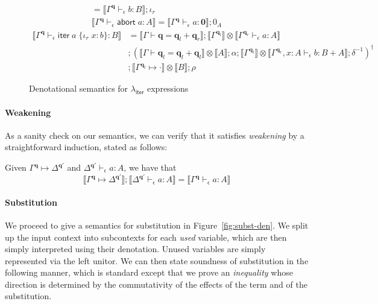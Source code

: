 \documentclass[acmsmall,screen,review]{acmart}
\newcommand{\mb}[1]{\ensuremath{\mathbf{#1}}}
\newcommand{\ms}[1]{\ensuremath{\mathsf{#1}}}
\newcommand{\lto}{:}
\newcommand{\linr}[1]{\iota_r\;{#1}}
\newcommand{\labort}[1]{\ms{abort}\;{#1}}
\newcommand{\liter}[3]{\ms{iter}\;#1\;\{ \linr{#2} \lto #3 \}}
\newcommand{\qsp}[4]{#1 \vdash #2 = #3 + #4}
\newcommand{\cwk}[2]{#1 \mapsto #2}
\newcommand{\hasty}[4]{#1 \vdash_{#2} #3: {#4}}
\newcommand{\dnt}[1]{\llbracket{#1}\rrbracket}
\newcommand{\subiterexp}{\texorpdfstring{\(\lambda_{\ms{iter}}\)}{lambda-iter}}
\begin{document}
\begin{figure}
\begin{gather*}
    = \dnt{\hasty{\Gamma^{\mb{q}}}{\epsilon}{b}{B}} ; \iota_r \\
    \dnt{\hasty{\Gamma^{\mb{q}}}{\epsilon}{\labort{a}}{A}}
    = \dnt{\hasty{\Gamma^{\mb{q}}}{\epsilon}{a}{\mb{0}}} ; 0_A
  \end{gather*}
  \begin{align*}
    \dnt{\hasty{\Gamma^{\mb{q}}}{\epsilon}{\liter{a}{x}{b}}{B}}
    &= 
    \dnt{\qsp{\Gamma}{\mb{q}}{\mb{q}_l}{\mb{q}_r}}
    ; \dnt{\Gamma^{\mb{q}_l}}
      \otimes \dnt{\hasty{\Gamma^{\mb{q}_r}}{\epsilon}{a}{A}} \\ &
    ; (
      \dnt{\qsp{\Gamma}{\mb{q}_l}{\mb{q}_l}{\mb{q}_l}} \otimes \dnt{A} 
      ; \alpha
      ; \dnt{\Gamma^{\mb{q}_l}} 
        \otimes \dnt{\hasty{\Gamma^{\mb{q}_r}, x : A}{\epsilon}{b}{B + A}}
      ; \delta^{-1}
    )^\dagger \\ &
    ; \dnt{\cwk{\Gamma^{\mb{q}_l}}{\cdot}} \otimes \dnt{B}
    ; \rho
  \end{align*}
  \caption{Denotational semantics for \subiterexp{} expressions}
  \Description{}
  \label{fig:expr-densem}
\end{figure}

\paragraph{Weakening}

As a sanity check on our semantics, we can verify that it satisfies \emph{weakening} by a
straightforward induction, stated as follows:
\begin{lemma}[Weakening]
  Given $\cwk{\Gamma^{\mb{q}}}{\Delta^{\mb{q}'}}$ and
  $\hasty{\Delta^{\mb{q}'}}{\epsilon}{a}{A}$, we have that
  $$
  \dnt{\cwk{\Gamma^{\mb{q}}}{\Delta^{\mb{q}'}}} ; \dnt{\hasty{\Delta^{\mb{q}'}}{\epsilon}{a}{A}}
  = \dnt{\hasty{\Gamma^{\mb{q}}}{\epsilon}{a}{A}}
  $$
\end{lemma}

\paragraph{Substitution}

We proceed to give a semantics for substitution in Figure~\ref{fig:subst-den}. We split up the input
context into subcontexts for each \emph{used} variable, which are then simply interpreted using
their denotation. Unused variables are simply represented via the left unitor. We can then state
soundness of substitution in the following manner, which is standard except that we prove an
\emph{inequality} whose direction is determined by the commutativity of the effects of the term and
of the substitution. 
\end{document}
